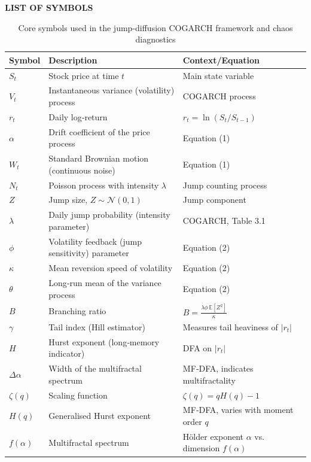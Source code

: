 \newpage
{}

\begin{center}
{\LARGE{\bf{LIST OF SYMBOLS}}}
\end{center}

\begin{table}[H]
\centering
\begin{tabular}{p{2.5cm} p{8cm} p{4cm}}
\hline
\textbf{Symbol} & \textbf{Description} & \textbf{Context/Equation} \\
\hline
$S_t$ & Stock price at time $t$ & Main state variable \\
$V_t$ & Instantaneous variance (volatility) process & COGARCH process \\
$r_t$ & Daily log‑return & $r_t = \ln(S_t/S_{t-1})$ \\
$\alpha$ & Drift coefficient of the price process & Equation (1) \\
$W_t$ & Standard Brownian motion (continuous noise) & Equation (1) \\
$N_t$ & Poisson process with intensity $\lambda$ & Jump counting process \\
$Z$ & Jump size, $Z \sim \mathcal{N}(0,1)$ & Jump component \\
$\lambda$ & Daily jump probability (intensity parameter) & COGARCH, Table 3.1 \\
$\phi$ & Volatility feedback (jump sensitivity) parameter & Equation (2) \\
$\kappa$ & Mean reversion speed of volatility & Equation (2) \\
$\theta$ & Long‑run mean of the variance process & Equation (2) \\
$B$ & Branching ratio & $B = \frac{\lambda\phi\,\mathbb{E}[Z^2]}{\kappa}$ \\
$\gamma$ & Tail index (Hill estimator) & Measures tail heaviness of $|r_t|$ \\
$H$ & Hurst exponent (long‑memory indicator) & DFA on $|r_t|$ \\
$\Delta\alpha$ & Width of the multifractal spectrum & MF‑DFA, indicates multifractality \\
$\zeta(q)$ & Scaling function & $\zeta(q) = qH(q) - 1$ \\
$H(q)$ & Generalised Hurst exponent & MF‑DFA, varies with moment order $q$ \\
$f(\alpha)$ & Multifractal spectrum & Hölder exponent $\alpha$ vs. dimension $f(\alpha)$ \\
\hline
\end{tabular}
\caption{Core symbols used in the jump‑diffusion COGARCH framework and chaos diagnostics}
\label{tab:symbols1}
\end{table}

